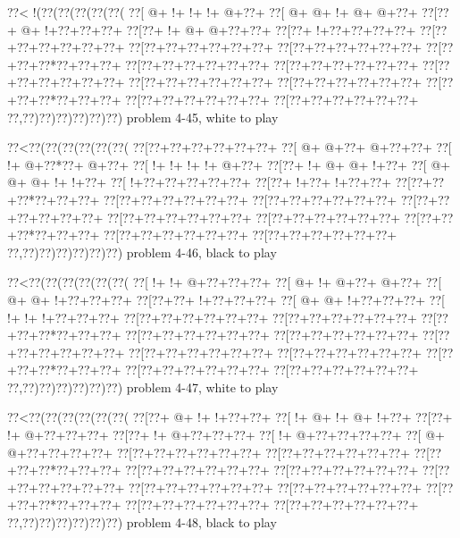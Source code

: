 \vbox{\vbox{\goo
\0??<\- !(\0??(\0??(\0??(\0??(\0??(
\0??[\- @+\- !+\- !+\- !+\- @+\0??+
\0??[\- @+\- @+\- !+\- @+\- @+\0??+
\0??[\0??+\- @+\- !+\0??+\0??+\0??+
\0??[\0??+\- !+\- @+\- @+\0??+\0??+
\0??[\0??+\- !+\0??+\0??+\0??+\0??+
\0??[\0??+\0??+\0??+\0??+\0??+\0??+
\0??[\0??+\0??+\0??+\0??+\0??+\0??+
\0??[\0??+\0??+\0??+\0??+\0??+\0??+
\0??[\0??+\0??+\0??*\0??+\0??+\0??+
\0??[\0??+\0??+\0??+\0??+\0??+\0??+
\0??[\0??+\0??+\0??+\0??+\0??+\0??+
\0??[\0??+\0??+\0??+\0??+\0??+\0??+
\0??[\0??+\0??+\0??+\0??+\0??+\0??+
\0??[\0??+\0??+\0??+\0??+\0??+\0??+
\0??[\0??+\0??+\0??*\0??+\0??+\0??+
\0??[\0??+\0??+\0??+\0??+\0??+\0??+
\0??[\0??+\0??+\0??+\0??+\0??+\0??+
\0??,\0??)\0??)\0??)\0??)\0??)\0??)
}
\hfil problem 4-45, white to play\hfil\break
}

\vbox{\vbox{\goo
\0??<\0??(\0??(\0??(\0??(\0??(\0??(
\0??[\0??+\0??+\0??+\0??+\0??+\0??+
\0??[\- @+\- @+\0??+\- @+\0??+\0??+
\0??[\- !+\- @+\0??*\0??+\- @+\0??+
\0??[\- !+\- !+\- !+\- !+\- @+\0??+
\0??[\0??+\- !+\- @+\- @+\- !+\0??+
\0??[\- @+\- @+\- @+\- !+\- !+\0??+
\0??[\- !+\0??+\0??+\0??+\0??+\0??+
\0??[\0??+\- !+\0??+\- !+\0??+\0??+
\0??[\0??+\0??+\0??*\0??+\0??+\0??+
\0??[\0??+\0??+\0??+\0??+\0??+\0??+
\0??[\0??+\0??+\0??+\0??+\0??+\0??+
\0??[\0??+\0??+\0??+\0??+\0??+\0??+
\0??[\0??+\0??+\0??+\0??+\0??+\0??+
\0??[\0??+\0??+\0??+\0??+\0??+\0??+
\0??[\0??+\0??+\0??*\0??+\0??+\0??+
\0??[\0??+\0??+\0??+\0??+\0??+\0??+
\0??[\0??+\0??+\0??+\0??+\0??+\0??+
\0??,\0??)\0??)\0??)\0??)\0??)\0??)
}
\hfil problem 4-46, black to play\hfil\break
}

\vbox{\vbox{\goo
\0??<\0??(\0??(\0??(\0??(\0??(\0??(
\0??[\- !+\- !+\- @+\0??+\0??+\0??+
\0??[\- @+\- !+\- @+\0??+\- @+\0??+
\0??[\- @+\- @+\- !+\0??+\0??+\0??+
\0??[\0??+\0??+\- !+\0??+\0??+\0??+
\0??[\- @+\- @+\- !+\0??+\0??+\0??+
\0??[\- !+\- !+\- !+\0??+\0??+\0??+
\0??[\0??+\0??+\0??+\0??+\0??+\0??+
\0??[\0??+\0??+\0??+\0??+\0??+\0??+
\0??[\0??+\0??+\0??*\0??+\0??+\0??+
\0??[\0??+\0??+\0??+\0??+\0??+\0??+
\0??[\0??+\0??+\0??+\0??+\0??+\0??+
\0??[\0??+\0??+\0??+\0??+\0??+\0??+
\0??[\0??+\0??+\0??+\0??+\0??+\0??+
\0??[\0??+\0??+\0??+\0??+\0??+\0??+
\0??[\0??+\0??+\0??*\0??+\0??+\0??+
\0??[\0??+\0??+\0??+\0??+\0??+\0??+
\0??[\0??+\0??+\0??+\0??+\0??+\0??+
\0??,\0??)\0??)\0??)\0??)\0??)\0??)
}
\hfil problem 4-47, white to play\hfil\break
}

\vbox{\vbox{\goo
\0??<\0??(\0??(\0??(\0??(\0??(\0??(
\0??[\0??+\- @+\- !+\- !+\0??+\0??+
\0??[\- !+\- @+\- !+\- @+\- !+\0??+
\0??[\0??+\- !+\- @+\0??+\0??+\0??+
\0??[\0??+\- !+\- @+\0??+\0??+\0??+
\0??[\- !+\- @+\0??+\0??+\0??+\0??+
\0??[\- @+\- @+\0??+\0??+\0??+\0??+
\0??[\0??+\0??+\0??+\0??+\0??+\0??+
\0??[\0??+\0??+\0??+\0??+\0??+\0??+
\0??[\0??+\0??+\0??*\0??+\0??+\0??+
\0??[\0??+\0??+\0??+\0??+\0??+\0??+
\0??[\0??+\0??+\0??+\0??+\0??+\0??+
\0??[\0??+\0??+\0??+\0??+\0??+\0??+
\0??[\0??+\0??+\0??+\0??+\0??+\0??+
\0??[\0??+\0??+\0??+\0??+\0??+\0??+
\0??[\0??+\0??+\0??*\0??+\0??+\0??+
\0??[\0??+\0??+\0??+\0??+\0??+\0??+
\0??[\0??+\0??+\0??+\0??+\0??+\0??+
\0??,\0??)\0??)\0??)\0??)\0??)\0??)
}
\hfil problem 4-48, black to play\hfil\break
}

